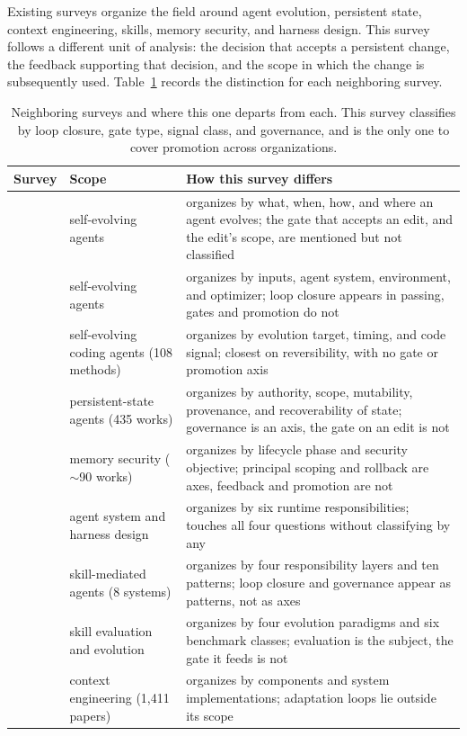 Existing surveys organize the field around agent evolution, persistent state, context engineering, skills, memory security, and harness design. This survey follows a different unit of analysis: the decision that accepts a persistent change, the feedback supporting that decision, and the scope in which the change is subsequently used. Table~\ref{tab:surveys} records the distinction for each neighboring survey.

\begin{table}[h]
\centering\small
\begin{tabular}{>{\raggedright\arraybackslash}p{}>{\raggedright\arraybackslash}p{}>{\raggedright\arraybackslash}p{}}
\toprule
Survey & Scope & How this survey differs \\
\midrule
\citet{gao2026selfevolving} & self-evolving agents & organizes by what, when, how, and where an agent evolves; the gate that accepts an edit, and the edit's scope, are mentioned but not classified \\
\citet{fang2025comprehensive} & self-evolving agents & organizes by inputs, agent system, environment, and optimizer; loop closure appears in passing, gates and promotion do not \\
\citet{zhou2026selfevolvingcoding} & self-evolving coding agents (108 methods) & organizes by evolution target, timing, and code signal; closest on reversibility, with no gate or promotion axis \\
\citet{ding2026alwayson} & persistent-state agents (435 works) & organizes by authority, scope, mutability, provenance, and recoverability of state; governance is an axis, the gate on an edit is not \\
\citet{lin2026memorysecurity} & memory security ($\sim$90 works) & organizes by lifecycle phase and security objective; principal scoping and rollback are axes, feedback and promotion are not \\
\citet{guo2026harness} & agent system and harness design & organizes by six runtime responsibilities; touches all four questions without classifying by any \\
\citet{xia2026harnessing} & skill-mediated agents (8 systems) & organizes by four responsibility layers and ten patterns; loop closure and governance appear as patterns, not as axes \\
\citet{ding2026skilleval} & skill evaluation and evolution & organizes by four evolution paradigms and six benchmark classes; evaluation is the subject, the gate it feeds is not \\
\citet{mei2025context} & context engineering (1,411 papers) & organizes by components and system implementations; adaptation loops lie outside its scope \\
\bottomrule
\end{tabular}
\caption{Neighboring surveys and where this one departs from each. This survey classifies by loop closure, gate type, signal class, and governance, and is the only one to cover promotion across organizations.}
\label{tab:surveys}
\end{table}


